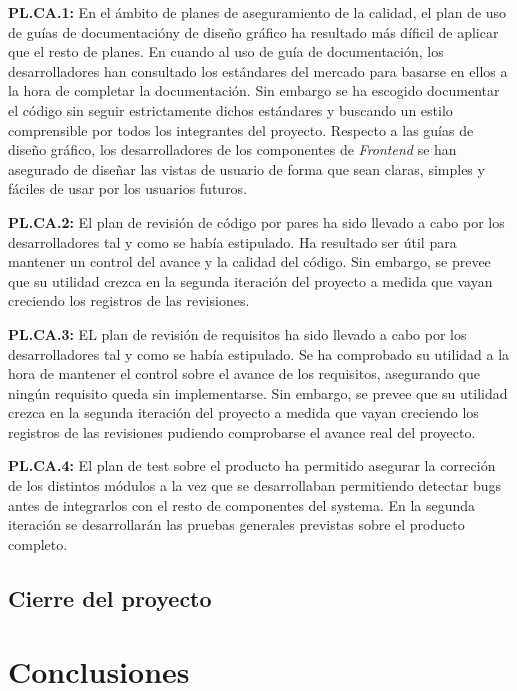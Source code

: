 \documentclass{article}
\begin{document}
\pagebreak

\textbf{PL.CA.1:}
En el ámbito de planes de aseguramiento de la calidad, el plan de uso de guías de documentacióny de diseño gráfico ha resultado más díficil de aplicar que el resto de planes. En cuando al uso de guía de documentación, los desarrolladores han consultado los estándares del mercado para basarse en ellos a la hora de completar la documentación. Sin embargo se ha escogido documentar el código sin seguir estrictamente dichos estándares y buscando un estilo comprensible por todos los integrantes del proyecto. Respecto a las guías de diseño gráfico, los desarrolladores de los componentes de \textit{Frontend} se han asegurado de diseñar las vistas de usuario de forma que sean claras, simples y fáciles de usar por los usuarios futuros.

\textbf{PL.CA.2:}
El plan de revisión de código por pares ha sido llevado a cabo por los desarrolladores tal y como se había estipulado. Ha resultado ser útil para mantener un control del avance y la calidad del código. Sin embargo, se prevee que su utilidad crezca en la segunda iteración del proyecto a medida que vayan creciendo los registros de las revisiones.

\textbf{PL.CA.3:}
EL plan de revisión de requisitos ha sido llevado a cabo por los desarrolladores tal y como se había estipulado.
Se ha comprobado su utilidad a la hora de mantener el control sobre el avance de los requisitos, asegurando que ningún requisito queda sin implementarse. Sin embargo, se prevee que su utilidad crezca en la segunda iteración del proyecto a medida que vayan creciendo los registros de las revisiones pudiendo comprobarse el avance real del proyecto.

\textbf{PL.CA.4:}
El plan de test sobre el producto ha permitido asegurar la correción de los distintos módulos a la vez que se desarrollaban permitiendo detectar bugs antes de integrarlos con el resto de componentes del systema. En la segunda iteración se desarrollarán las pruebas generales previstas sobre el producto completo.


\subsection{Cierre del proyecto}

\section*{Conclusiones}
\end{document}
